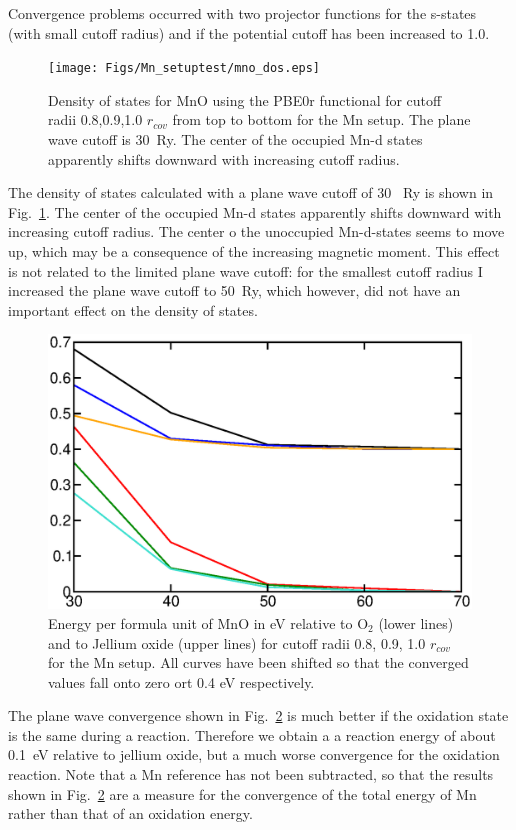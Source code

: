 \documentclass[11pt,a4paper]{report}
\begin{document}
Convergence problems occurred with two projector functions for the
s-states (with small cutoff radius) and if the potential cutoff has
been increased to 1.0.

\begin{figure}[!h]
\begin{center}
\texttt{[image: Figs/Mn\_setuptest/mno\_dos.eps]}
\end{center}
\caption{\label{fig:mno_dos} Density of states for MnO using the PBE0r
  functional for cutoff radii 0.8,0.9,1.0 $r_{cov}$ from top to bottom
  for the Mn setup. The plane wave cutoff is 30~Ry.  The center of the
  occupied Mn-d states apparently shifts downward with increasing
  cutoff radius.}
\end{figure}
The density of states calculated with a plane wave cutoff of 30~ Ry is
shown in Fig.~\ref{fig:mno_dos}. The center of the occupied Mn-d
states apparently shifts downward with increasing cutoff radius. The
center o the unoccupied Mn-d-states seems to move up, which may be a
consequence of the increasing magnetic moment. This effect is not
related to the limited plane wave cutoff: for the smallest cutoff
radius I increased the plane wave cutoff to 50~Ry, which however, did
not have an important effect on the density of states.


\begin{figure}[!h]
\begin{center}
\includegraphics[width=0.5\linewidth,clip=true]{Figs/Mn_setuptest/eoxepwconv.eps}
\end{center}
\caption{\label{eoxepwconv}Energy per formula unit of MnO in
  eV relative to  O$_2$ (lower lines) and to Jellium oxide (upper
  lines) for cutoff radii 0.8, 0.9, 1.0 $r_{cov}$ for the Mn
  setup. All curves have been shifted so that the converged values
  fall onto zero ort 0.4 eV respectively.}
\end{figure}
The plane wave convergence shown in Fig.~\ref{eoxepwconv} is much
better if the oxidation state is the same during a reaction. Therefore
we obtain a a reaction energy of about 0.1~eV relative to jellium
oxide, but a much worse convergence for the oxidation reaction.  Note
that a Mn reference has not been subtracted, so that the results shown
in Fig.~\ref{eoxepwconv} are a measure for the convergence of the
total energy of Mn rather than that of an oxidation energy.
\end{document}
